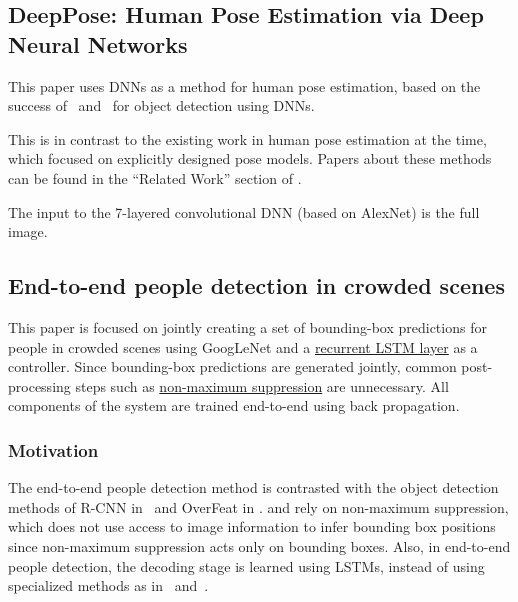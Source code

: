 \documentclass[a4paper, 12pt]{article}
\begin{document}
\subsection{DeepPose: Human Pose Estimation via Deep Neural
            Networks\cite{DBLP:journals/corr/ToshevS13}}

This paper uses DNNs as a method for human pose estimation, based on the
success of~\cite{NIPS2013_5207} and~\cite{DBLP:journals/corr/GirshickDDM13} for
object detection using DNNs.

This is in contrast to the existing work in human pose estimation at the time,
which focused on explicitly designed pose models. Papers about these methods
can be found in the ``Related Work'' section of
\cite{DBLP:journals/corr/ToshevS13}.

The input to the 7-layered convolutional DNN (based on
AlexNet\cite{NIPS2012_4824}) is the full image.

\subsection{End-to-end people detection in crowded
            scenes\cite{DBLP:journals/corr/StewartA15}}

This paper is focused on jointly creating a set of bounding-box predictions for
people in crowded scenes using GoogLeNet and a
\hyperref[LSTM]{recurrent LSTM layer} as a controller. Since bounding-box
predictions are generated jointly, common post-processing steps such as
\hyperref[nonmax_supression]{non-maximum suppression} are unnecessary.  All
components of the system are trained end-to-end using back propagation.

\subsubsection{Motivation}

The end-to-end people detection method is contrasted with the object detection
methods of R-CNN in~\cite{DBLP:journals/corr/GirshickDDM13} and OverFeat in
\cite{DBLP:journals/corr/SermanetEZMFL13}.
\cite{DBLP:journals/corr/GirshickDDM13} and
\cite{DBLP:journals/corr/SermanetEZMFL13} rely on non-maximum suppression,
which does not use access to image information to infer bounding box positions
since non-maximum suppression acts only on bounding boxes. Also, in end-to-end
people detection, the decoding stage is learned using LSTMs, instead of using
specialized methods as in~\cite{VisualPhrases} and~\cite{TaAnSc_14:occluded}.
\end{document}
